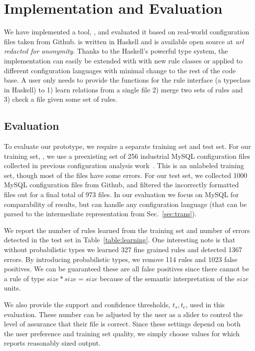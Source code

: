 
\section{Implementation and Evaluation}

We have implemented a tool, \app, and evaluated it based on real-world configuration files taken from Github.
\app is written in Haskell and is available open source at \textit{url redacted for anonymity}.
Thanks to the Haskell's powerful type system, the implementation can easily be extended with with new rule classes or applied to different configuration languages with minimal change to the rest of the code base.
A user only needs to provide the functions for the rule interface (a typeclass in Haskell) to 1) learn relations from a single file 2) merge two sets of rules and 3) check a file given some set of rules.

\subsection{Evaluation}

To evaluate our \app prototype, we require a separate training set and test set. 
For our training set, \trainingSet, we use a preexisting set of 256 
industrial MySQL configuration files collected in previous configuration 
analysis work~\cite{configdataset}.
This is an unlabeled training set, though most of the files have some errors.
For our test set, we collected 1000 MySQL configuration files 
from Github, and filtered the incorrectly formatted files out for a final 
total of 973 files.
In our evaluation we focus on MySQL for comparability of results, but \app can handle any configuration language (that can be parsed to the intermediate representation from Sec.~\ref{sec:trans}).

We report the number of rules learned from the training set and number of errors detected in the test set in Table~\ref{table:learning}.
One interesting note is that without probabilistic types we learned 327 fine grained rules and detected 1367 errors.
By introducing probabilistic types, we remove 114 rules and 1023 false positives.
We can be guaranteed these are all false positives since there cannot be a rule of type $size*size=size$ because of the semantic interpretation of the $size$ units.

We also provide the support and confidence thresholds, $t_s, t_c$, used in this evaluation.
These number can be adjusted by the user as a slider to control the level of assurance that their file is correct.
Since these settings depend on both the user preference and training set quality, we simply choose values for which \app reports reasonably sized output.

